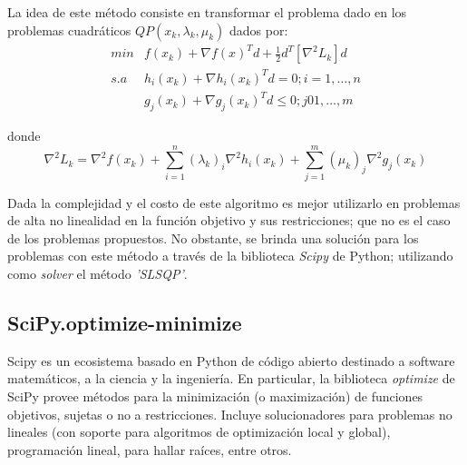 \documentclass[titlepage, 11pt]{scrartcl}
\begin{document}
	La idea de este método consiste en transformar el problema dado en los problemas cuadráticos $QP(x_k, \lambda_k, \mu_k)$ dados por:
	\begin{align*}
		min &f(x_k) + \nabla f(x)^Td + \frac{1}{2}d^T[\nabla^2L_k]d\\
		s.a &h_i(x_k) + \nabla h_i(x_k)^Td = 0; i = 1, \ldots, n\\
		&g_j(x_k) + \nabla g_j(x_k)^T d \leq 0; j 0 1, \ldots, m
	\end{align*}
	
	donde
	\begin{equation*}
		\nabla^2 L_k = \nabla^2f(x_k) + \sum_{i = 1}^{n}(\lambda_k)_i\nabla^2h_i(x_k) + \sum_{j = 1}^{m}(\mu_k)_j\nabla^2g_j(x_k)
	\end{equation*}
	
	
	Dada la complejidad y el costo de este algoritmo es mejor utilizarlo en problemas de alta no linealidad en la función objetivo y sus restricciones; que no es el caso de los problemas propuestos. No obstante, se brinda una solución para los problemas con este método a través de la biblioteca \textit{Scipy} de Python; utilizando como \textit{solver} el método \textit{'SLSQP'}.
	
	\subsection{SciPy.optimize-minimize}
	Scipy es un ecosistema basado en Python de código abierto destinado a software matemáticos, a la ciencia y la ingeniería. En particular, la biblioteca \textit{optimize} de SciPy provee métodos para la minimización (o maximización) de funciones objetivos, sujetas o no a restricciones. Incluye solucionadores para problemas no lineales (con soporte para algoritmos de optimización local y global), programación lineal, para hallar raíces, entre otros.
	
\end{document}
